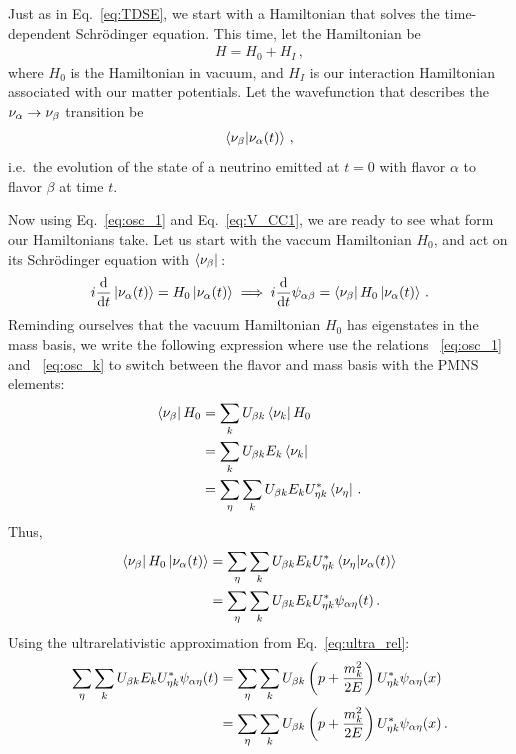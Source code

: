 \documentclass[draft=True]{revtex4-2}
\begin{document}
Just as in Eq.~\ref{eq:TDSE}, we start with a Hamiltonian that solves the time-dependent Schrödinger equation. This time, let the Hamiltonian be 
\begin{align}
    H = H_0 + H_{I}\,,
\end{align}
where $H_0$ is the Hamiltonian in vacuum, and $H_{I}$ is our interaction Hamiltonian associated with our matter potentials.
Let the wavefunction that describes the $\nu_{\alpha} \to \nu_{\beta}$ transition be 
\begin{align}
    \bra{\nu_{\beta}}\ket{\nu_{\alpha} (t)}\,,
\end{align}
i.e.~the evolution of the state of a neutrino emitted at $t =0$ with flavor $\alpha$ to flavor $\beta$ at time $t$.

Now using Eq.~\ref{eq:osc_1} and Eq.~\ref{eq:V_CC1}, we are ready to see what form our Hamiltonians take.
Let us start with the vaccum Hamiltonian $H_0$, and act on its Schrödinger equation with $\bra{\nu_{\beta}}\,$:
\begin{align}
    i \dv{}{t}\ket{\nu_{\alpha} (t)} = H_0\ket{\nu_{\alpha} (t)} \implies i \dv{}{t}\psi_{\alpha\beta} = \bra{\nu_{\beta}}H_0\ket{\nu_{\alpha} (t)}\,.
\end{align}
Reminding ourselves that the vacuum Hamiltonian $H_0$ has eigenstates in the mass basis, we write the following expression where 
use the relations ~\ref{eq:osc_1} and ~\ref{eq:osc_k} to switch between the flavor and mass basis with the PMNS elements:
\begin{align}
    \bra{\nu_{\beta}} H_0 &= \sum_k U_{\beta k} \bra{\nu_k}H_0 \nonumber \\
                     &= \sum_k U_{\beta k} E_k \bra{\nu_k} \nonumber \\
                     &= \sum_\eta \sum_k U_{\beta k} E_k U^*_{\eta k} \bra{\nu_\eta}\,.
\end{align}
Thus,
\begin{align}
    \bra{\nu_{\beta}}H_0\ket{\nu_{\alpha} (t)} &= \sum_\eta \sum_k U_{\beta k} E_k U^*_{\eta k} \bra{\nu_\eta}\ket{\nu_{\alpha} (t)} \nonumber \\
                                    &= \sum_\eta \sum_k U_{\beta k} E_k U^*_{\eta k} \psi_{\alpha\eta}(t)\,.
\end{align}
Using the ultrarelativistic approximation from Eq.~\ref{eq:ultra_rel}:
\begin{align}
    \sum_\eta \sum_k U_{\beta k} E_k U^*_{\eta k} \psi_{\alpha\eta}(t) &= \sum_\eta \sum_k U_{\beta k} \left(p + \frac{m^2_k}{2E}\right) U^*_{\eta k} \psi_{\alpha\eta}(x) \nonumber \\
    &= \sum_\eta \sum_k U_{\beta k} \left(p + \frac{m^2_k}{2E}\right) U^*_{\eta k} \psi_{\alpha\eta}(x)\,.
\end{align}
\end{document}
